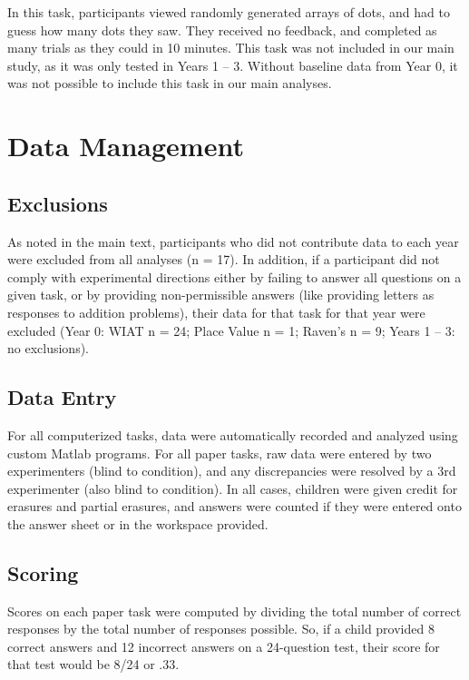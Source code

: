 \documentclass[11pt]{article}
\begin{document}
In this task, participants viewed randomly generated arrays of dots, and had to guess how many dots they saw. They received no feedback, and completed as many trials as they could in 10 minutes. This task was not included in our main study, as it was only tested in Years 1 -- 3. Without baseline data from Year 0, it was not possible to include this task in our main analyses.

\section{Data Management}

\subsection{Exclusions}

As noted in the main text, participants who did not contribute data to each year were excluded from all analyses (n = 17). In addition, if a participant did not comply with experimental directions either by failing to answer all questions on a given task, or by providing non-permissible answers (like providing letters as responses to addition problems), their data for that task for that year were excluded (Year 0: WIAT n = 24; Place Value n = 1; Raven's n = 9; Years 1 -- 3: no exclusions).

\subsection{Data Entry}

For all computerized tasks, data were automatically recorded and analyzed using custom Matlab programs. For all paper tasks, raw data were entered by two experimenters (blind to condition), and any discrepancies were resolved by a 3rd experimenter (also blind to condition). In all cases, children were given credit for erasures and partial erasures, and answers were counted if they were entered onto the answer sheet or in the workspace provided.

\subsection{Scoring}

Scores on each paper task were computed by dividing the total number of correct responses by the total number of responses possible. So, if a child provided 8 correct answers and 12 incorrect answers on a 24-question test, their score for that test would be 8/24 or .33.
\end{document}
